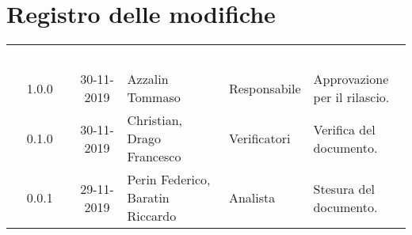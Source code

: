 \section*{Registro delle modifiche}
{
\renewcommand{\arraystretch}{1.5}
\centering
\begin{longtable}{ c c  C{4cm}  C{3cm} C{4cm}}
\textcolor{white}{\textbf{Versione}} & \textcolor{white}{\textbf{Data}} & \textcolor{white}{\textbf{Nominativo}} & \textcolor{white}{\textbf{Ruolo}} & \textcolor{white}{\textbf{Descrizione}}\\	


1.0.0 & 30-11-2019 & Azzalin Tommaso & Responsabile & Approvazione per il rilascio.  \\
		
0.1.0 & 30-11-2019 & Christian, Drago Francesco & Verificatori & Verifica del documento.  \\
		
0.0.1 & 29-11-2019 & Perin Federico, Baratin Riccardo  & Analista & Stesura del documento.  \\
        

\end{longtable}
}